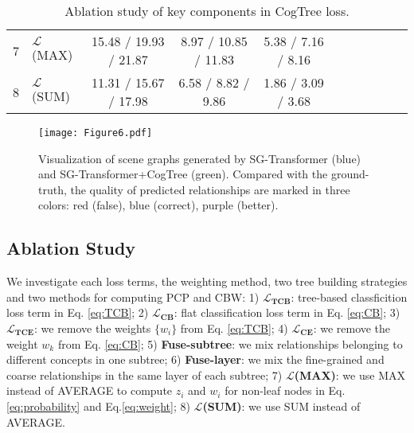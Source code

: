 \documentclass{article}
\begin{document}
\begin{table}[t]
{\begin{tabular}{llccccccccc}
\multicolumn{1}{l|}{7} & \multicolumn{1}{l|}{$\mathcal{L}$(MAX)}   & \multicolumn{1}{c|}{15.48 / 19.93 / 21.87}           & \multicolumn{1}{c|}{8.97 / 10.85 / 11.83}            & 5.38 / 7.16 / 8.16                                   \\ 
\multicolumn{1}{l|}{8} & \multicolumn{1}{l|}{$\mathcal{L}$(SUM)}   & \multicolumn{1}{c|}{11.31 / 15.67 / 17.98}           & \multicolumn{1}{c|}{6.58 / 8.82 / 9.86}              & 1.86 / 3.09 / 3.68                                   \\  \hline
\end{tabular}}
\caption{Ablation study of key components in CogTree loss.}
\label{tab:ablation}
\end{table}




\begin{figure*}[t]
    \centering
    \texttt{[image: Figure6.pdf]}
    \caption{Visualization of scene graphs generated by SG-Transformer (blue) and SG-Transformer+CogTree (green). Compared with the ground-truth, the quality of predicted relationships are marked in three colors: red (false), blue (correct), purple (better).}
    \label{fig:cases}
\end{figure*}










\subsection{Ablation Study}
We investigate each loss terms, the weighting method,
two tree building strategies  and two methods for computing PCP and CBW: 1) $\mathbf{\mathcal{L}_{TCB}}$:
tree-based classficition loss term in Eq. \ref{eq:TCB}; 2) $\mathbf{\mathcal{L}_{CB}}$: flat classification loss term in Eq. \ref{eq:CB}; 3) $\mathbf{\mathcal{L}_{TCE}}$: we remove the weights $\{w_i\}$ from Eq. \ref{eq:TCB}; 4)  $\mathbf{\mathcal{L}_{CE}}$: we remove the weight $w_k$ from Eq. \ref{eq:CB}; 5) \textbf{Fuse-subtree}: we mix  relationships  belonging  to  different  concepts in one subtree; 6) \textbf{Fuse-layer}: we 
mix the fine-grained  and coarse relationships  in  the  same layer of
each subtree; 7) $\mathbf{\mathcal{L}}$\textbf{(MAX)}: we use MAX instead of AVERAGE to compute $z_i$ and $w_i$ for non-leaf nodes in Eq.\ref{eq:probability} and Eq.\ref{eq:weight}; 8) $\mathbf{\mathcal{L}}$\textbf{(SUM)}: we use SUM instead of AVERAGE. 
\end{document}
